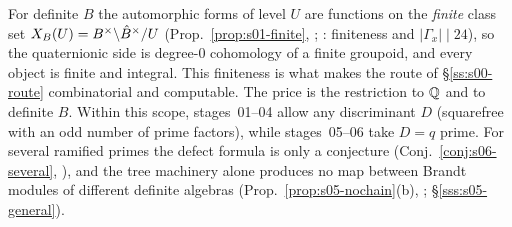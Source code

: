 For definite $B$ the automorphic forms of level $U$ are functions on the \emph{finite} class set $X_B(U)=B^\times\backslash\hat{B}^\times/U$
(Prop.~\ref{prop:s01-finite}, \stknown; \stformal{}: finiteness and $|\Gamma_x|\mid24$), so the quaternionic side is degree-$0$ cohomology of a finite groupoid, and every
object is finite and integral. This finiteness is what makes the route of \S\ref{ss:s00-route} combinatorial and computable. The
price is the restriction to $\mathbb{Q}$ and to definite $B$. Within this scope, stages~01--04 allow any discriminant $D$ (squarefree with
an odd number of prime factors), while stages~05--06 take $D=q$ prime. For several ramified primes the defect formula is only a
conjecture (Conj.~\ref{conj:s06-several}, \stconj), and the tree machinery alone produces no map between Brandt modules of
different definite algebras (Prop.~\ref{prop:s05-nochain}(b), \stproved; \S\ref{sss:s05-general}).
